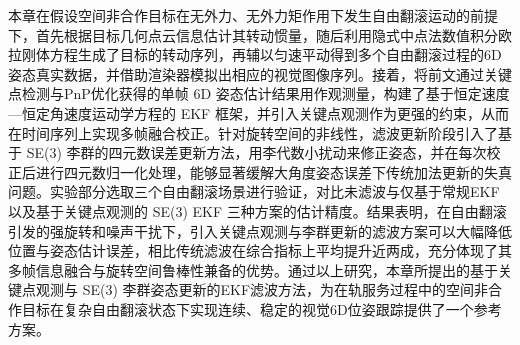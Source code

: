 本章在假设空间非合作目标在无外力、无外力矩作用下发生自由翻滚运动的前提下，首先根据目标几何点云信息估计其转动惯量，随后利用隐式中点法数值积分欧拉刚体方程生成了目标的转动序列，再辅以匀速平动得到多个自由翻滚过程的6D姿态真实数据，并借助渲染器模拟出相应的视觉图像序列。接着，将前文通过关键点检测与PnP优化获得的单帧 6D 姿态估计结果用作观测量，构建了基于恒定速度—恒定角速度运动学方程的 EKF 框架，并引入关键点观测作为更强的约束，从而在时间序列上实现多帧融合校正。针对旋转空间的非线性，滤波更新阶段引入了基于 SE(3) 李群的四元数误差更新方法，用李代数小扰动来修正姿态，并在每次校正后进行四元数归一化处理，能够显著缓解大角度姿态误差下传统加法更新的失真问题。实验部分选取三个自由翻滚场景进行验证，对比未滤波与仅基于常规EKF以及基于关键点观测的 SE(3) EKF 三种方案的估计精度。结果表明，在自由翻滚引发的强旋转和噪声干扰下，引入关键点观测与李群更新的滤波方案可以大幅降低位置与姿态估计误差，相比传统滤波在综合指标上平均提升近两成，充分体现了其多帧信息融合与旋转空间鲁棒性兼备的优势。通过以上研究，本章所提出的基于关键点观测与 SE(3) 李群姿态更新的EKF滤波方法，为在轨服务过程中的空间非合作目标在复杂自由翻滚状态下实现连续、稳定的视觉6D位姿跟踪提供了一个参考方案。
